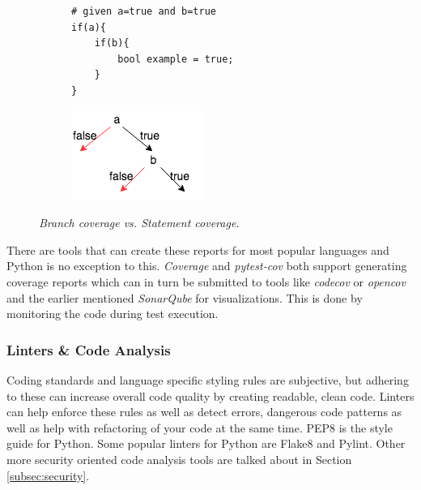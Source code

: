 \begin{figure}[!htb]
    \begin{subfigure}[b]{0.5\textwidth}
    \begin{lstlisting}[frame=single, basicstyle=\small, linewidth=.9\textwidth]
# given a=true and b=true
if(a){
    if(b){
        bool example = true;
    }
}
    \end{lstlisting}
    \end{subfigure}
    \begin{subfigure}[b]{0.5\textwidth}
    \centering
    \includegraphics[width=.75\textwidth]{figures/branch-statement.png}
    \end{subfigure}
    \caption{\vspace{-3mm}\textit{Branch coverage vs. Statement coverage.}\cite{stack-cov}}
    \label{fig:codecoverage}
\end{figure} 

There are tools that can create these reports for most popular languages and Python is no exception to this. \textit{Coverage} and \textit{pytest-cov}\cite{pytest-cov} both support generating coverage reports which can in turn be submitted to tools like \textit{codecov} or \textit{opencov} and the earlier mentioned \textit{SonarQube} for visualizations.\cite{codecov} This is done by monitoring the code during test execution.

\subsubsection{Linters \& Code Analysis}
Coding standards and language specific styling rules are subjective, but adhering to these can increase overall code quality by creating readable, clean code. Linters can help enforce these rules as well as detect errors, dangerous code patterns as well as help with refactoring of your code at the same time. PEP8 is the style guide for Python.\cite{pep8} Some popular linters for Python are Flake8 and Pylint.\cite{pylint} Other more security oriented code analysis tools are talked about in Section \ref{subsec:security}.

